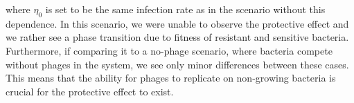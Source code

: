 where $\eta_0$ is set to be the same infection rate as in the scenario without this dependence.
In this scenario, we were unable to observe the protective effect and we rather see a phase transition due to fitness of resistant and sensitive bacteria. Furthermore, if comparing it to a no-phage scenario, where bacteria compete without phages in the system, we see only minor differences between these cases.
This means that the ability for phages to replicate on non-growing bacteria is crucial for the protective effect to exist.








